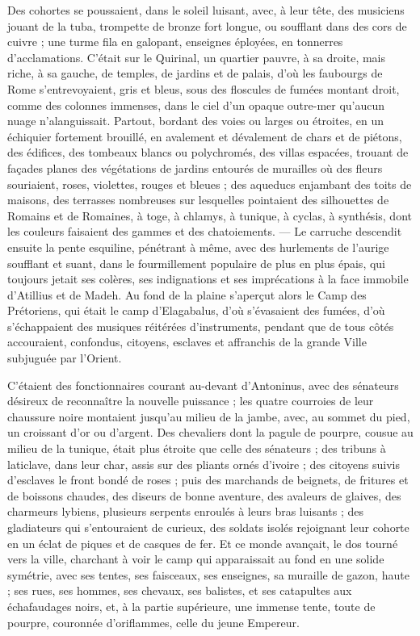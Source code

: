 \documentclass[a4paper, 11pt, oneside, polutonikogreek, french]{article}
\begin{document}
Des cohortes se poussaient, dans le soleil luisant, avec, à leur tête, des musiciens jouant de la tuba, trompette de bronze fort longue, ou soufflant dans des cors de cuivre ; une turme fila en galopant, enseignes éployées, en tonnerres d'acclamations. C'était sur le Quirinal, un quartier pauvre, à sa droite, mais riche, à sa gauche, de temples, de jardins et de palais, d'où les faubourgs de Rome s'entrevoyaient, gris et bleus, sous des floscules de fumées montant droit, comme des colonnes immenses, dans le ciel d'un opaque outre-mer qu'aucun nuage n'alanguissait. Partout, bordant des voies ou larges ou étroites, en un échiquier fortement brouillé, en avalement et dévalement de chars et de piétons, des édifices, des tombeaux blancs ou polychromés, des villas espacées, trouant de façades planes des végétations de jardins entourés de murailles où des fleurs souriaient, roses, violettes, rouges et bleues ; des aqueducs enjambant des toits de maisons, des terrasses nombreuses sur lesquelles pointaient des silhouettes de Romains et de Romaines, à toge, à chlamys, à tunique, à cyclas, à synthésis, dont les couleurs faisaient des gammes et des chatoiements. --- Le carruche descendit ensuite la pente esquiline, pénétrant à même, avec des hurlements de l'aurige soufflant et suant, dans le fourmillement populaire de plus en plus épais, qui toujours jetait ses colères, ses indignations et ses imprécations à la face immobile d'Atillius et de Madeh. Au fond de la plaine s'aperçut alors le Camp des Prétoriens, qui était le camp d'Elagabalus, d'où s'évasaient des fumées, d'où s'échappaient des musiques réitérées d'instruments, pendant que de tous côtés accouraient, confondus, citoyens, esclaves et affranchis de la grande Ville subjuguée par l'Orient.

C'étaient des fonctionnaires courant au-devant d'Antoninus, avec des sénateurs désireux de reconnaître la nouvelle puissance ; les quatre courroies de leur chaussure noire montaient jusqu'au milieu de la jambe, avec, au sommet du pied, un croissant d'or ou d'argent. Des chevaliers dont la pagule de pourpre, cousue au milieu de la tunique, était plus étroite que celle des sénateurs ; des tribuns à laticlave, dans leur char, assis sur des pliants ornés d'ivoire ; des citoyens suivis d'esclaves le front bondé de roses ; puis des marchands de beignets, de fritures et de boissons chaudes, des diseurs de bonne aventure, des avaleurs de glaives, des charmeurs lybiens, plusieurs serpents enroulés à leurs bras luisants ; des gladiateurs qui s'entouraient de curieux, des soldats isolés rejoignant leur cohorte en un éclat de piques et de casques de fer. Et ce monde avançait, le dos tourné vers la ville, charchant à voir le camp qui apparaissait au fond en une solide symétrie, avec ses tentes, ses faisceaux, ses enseignes, sa muraille de gazon, haute ; ses rues, ses hommes, ses chevaux, ses balistes, et ses catapultes aux échafaudages noirs, et, à la partie supérieure, une immense tente, toute de pourpre, couronnée d'oriflammes, celle du jeune Empereur.
\end{document}
